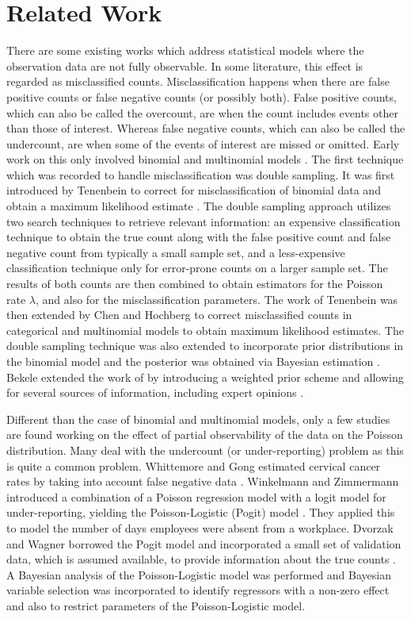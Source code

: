 \section{Related Work}
\label{sec:related}

There are some existing works which address statistical models where the observation data are not fully observable. In some literature, this effect is regarded as misclassified counts. Misclassification happens when there are false positive counts or false negative counts (or possibly both). False positive counts, which can also be called the overcount, are when the count includes events other than those of interest. Whereas false negative counts, which can also be called the undercount, are when some of the events of interest are missed or omitted. Early work on this only involved binomial and multinomial models \cite{Bross1954,Chen1979,Hochberg1977,Tenenbein1970,Viana1993}. The first technique which was recorded to handle misclassification was double sampling. It was first introduced by Tenenbein to correct for misclassification of binomial data and obtain a maximum likelihood estimate \cite{Tenenbein1970}. The double sampling approach utilizes two search techniques to retrieve relevant information: an expensive classification technique to obtain the true count along with the false positive count and false negative count from typically a small sample set, and a less-expensive classification technique only for error-prone counts on a larger sample set. The results of both counts are then combined to obtain estimators for the Poisson rate $\lambda$, and also for the misclassification parameters. The work of Tenenbein was then extended by Chen \cite{Chen1979} and Hochberg \cite{Hochberg1977} to correct misclassified counts in categorical and multinomial models to obtain maximum likelihood estimates. The double sampling technique was also extended to incorporate prior distributions in the binomial model and the posterior was obtained via Bayesian estimation \cite{Viana1993}. Bekele extended the work of \cite{Viana1993} by introducing a weighted prior scheme and allowing for several sources of information, including expert opinions \cite{bekele1998binomial}.

Different than the case of binomial and multinomial models, only a few studies are found working on the effect of partial observability of the data on the Poisson distribution. Many deal with the undercount (or under-reporting) problem as this is quite a common problem. Whittemore and Gong estimated cervical cancer rates by taking into account false negative data \cite{whittemore1991}. Winkelmann and Zimmermann introduced a combination of a Poisson regression model with a logit model for under-reporting, yielding the Poisson-Logistic (Pogit) model \cite{winkelmann1993poisson}. They applied this to model the number of days employees were absent from a workplace. Dvorzak and Wagner borrowed the Pogit model and incorporated a small set of validation data, which is assumed available, to provide information about the true counts \cite{dvorzak2016}. A Bayesian analysis of the Poisson-Logistic model was performed and Bayesian variable selection was incorporated to identify regressors with a non-zero effect and also to restrict parameters of the Poisson-Logistic model.

